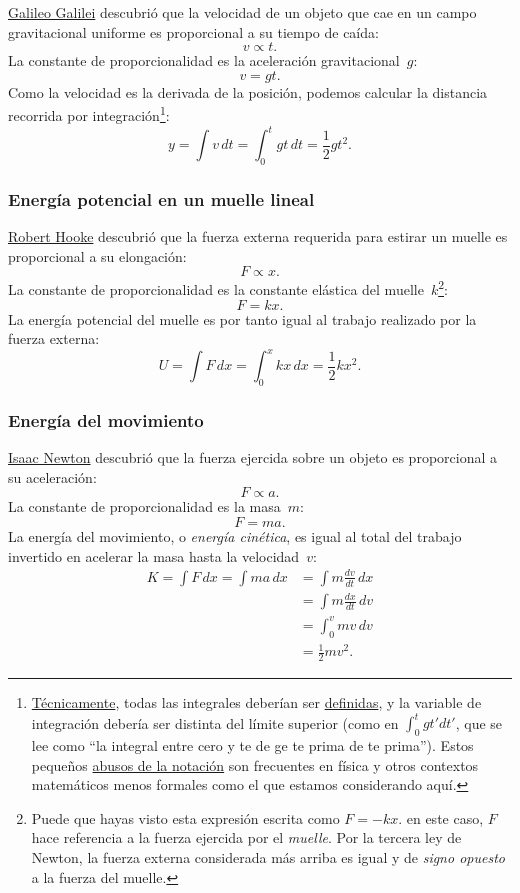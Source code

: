\href{https://es.wikipedia.org/wiki/Galileo_Galilei}{Galileo Galilei} descubrió que la velocidad de un objeto que cae en un campo gravitacional uniforme es proporcional a su tiempo de caída:
\[ v \propto t. \]
La constante de proporcionalidad es la aceleración gravitacional~$g$:
\[ v = g t. \]
Como la velocidad es la derivada de la posición, podemos calcular la distancia recorrida por integración\footnote{\href{https://m.xkcd.com/1475/}{Técnicamente}, todas las integrales deberían ser \href{https://mathworld.wolfram.com/DefiniteIntegral.html}{definidas}, y la variable de integración debería ser distinta del límite superior (como en $\int_0^t gt' dt'$, que se lee como ``la integral entre cero y te de ge te prima de te prima''). Estos pequeños \href{https://en.wikipedia.org/wiki/Abuse_of_notation}{abusos de la notación} son frecuentes en física y otros contextos matemáticos menos formales como el que estamos considerando aquí.}:
\[ y = \int v\,dt = \int_0^t gt\,dt = \textstyle{\frac{1}{2}} gt^2. \]


    \subsubsection{Energía potencial en un muelle lineal} %
    \label{sec:potential_energy_in_a_linear_spring}

\href{https://es.wikipedia.org/wiki/Robert_Hooke}{Robert Hooke} descubrió que la fuerza externa requerida para estirar un muelle es proporcional a su elongación:
\[ F \propto x. \]
La constante de proporcionalidad es la constante elástica del muelle~$k$\footnote{Puede que hayas visto esta expresión escrita como $F = -kx$. en este caso, $F$ hace referencia a la fuerza ejercida por el \emph{muelle}. Por la tercera ley de Newton, la fuerza externa considerada más arriba es igual y de \emph{signo opuesto} a la fuerza del muelle.}:
\[ F = k x. \]
La energía potencial del muelle es por tanto igual al trabajo realizado por la fuerza externa:
\[ U = \int F\,dx = \int_0^x kx\,dx = \textstyle{\frac{1}{2}} kx^2. \]

    \subsubsection{Energía del movimiento} %
    \label{sec:energy_of_motion}

\href{https://es.wikipedia.org/wiki/Isaac_Newton}{Isaac Newton} descubrió que la fuerza ejercida sobre un objeto es proporcional a su aceleración:
\[ F \propto a. \]
La constante de proporcionalidad es la masa~$m$:
\[ F = m a. \]
La energía del movimiento, o \emph{energía cinética}, es igual al total del trabajo invertido en acelerar la masa hasta la velocidad~$v$:
\[
\begin{split}
K = \int F\,dx = \int ma\,dx & = \int m\frac{dv}{dt}\,dx \\ & = \int m\frac{dx}{dt}\,dv \\ & = \int_0^v mv\,dv \\ & = \textstyle{\frac{1}{2}} mv^2.
\end{split}
\]

